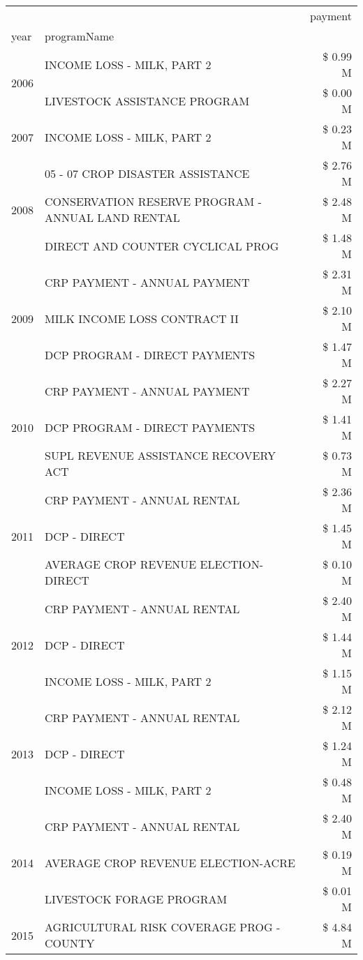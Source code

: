 \begin{tabular}{llr}
\toprule
 &  & payment \\
year & programName &  \\
\midrule
\multirow[t]{2}{*}{2006} & INCOME LOSS - MILK, PART 2 & \$ 0.99 M \\
 & LIVESTOCK ASSISTANCE PROGRAM & \$ 0.00 M \\
\cline{1-3}
2007 & INCOME LOSS - MILK, PART 2 & \$ 0.23 M \\
\cline{1-3}
\multirow[t]{3}{*}{2008} & 05 - 07 CROP DISASTER ASSISTANCE & \$ 2.76 M \\
 & CONSERVATION RESERVE PROGRAM - ANNUAL LAND RENTAL & \$ 2.48 M \\
 & DIRECT AND COUNTER CYCLICAL PROG & \$ 1.48 M \\
\cline{1-3}
\multirow[t]{3}{*}{2009} & CRP PAYMENT - ANNUAL PAYMENT & \$ 2.31 M \\
 & MILK INCOME LOSS CONTRACT II & \$ 2.10 M \\
 & DCP PROGRAM - DIRECT PAYMENTS & \$ 1.47 M \\
\cline{1-3}
\multirow[t]{3}{*}{2010} & CRP PAYMENT - ANNUAL PAYMENT & \$ 2.27 M \\
 & DCP PROGRAM - DIRECT PAYMENTS & \$ 1.41 M \\
 & SUPL REVENUE ASSISTANCE RECOVERY ACT & \$ 0.73 M \\
\cline{1-3}
\multirow[t]{3}{*}{2011} & CRP PAYMENT - ANNUAL RENTAL & \$ 2.36 M \\
 & DCP - DIRECT & \$ 1.45 M \\
 & AVERAGE CROP REVENUE ELECTION-DIRECT & \$ 0.10 M \\
\cline{1-3}
\multirow[t]{3}{*}{2012} & CRP PAYMENT - ANNUAL RENTAL & \$ 2.40 M \\
 & DCP - DIRECT & \$ 1.44 M \\
 & INCOME LOSS - MILK, PART 2 & \$ 1.15 M \\
\cline{1-3}
\multirow[t]{3}{*}{2013} & CRP PAYMENT - ANNUAL RENTAL & \$ 2.12 M \\
 & DCP - DIRECT & \$ 1.24 M \\
 & INCOME LOSS - MILK, PART 2 & \$ 0.48 M \\
\cline{1-3}
\multirow[t]{3}{*}{2014} & CRP PAYMENT - ANNUAL RENTAL & \$ 2.40 M \\
 & AVERAGE CROP REVENUE ELECTION-ACRE & \$ 0.19 M \\
 & LIVESTOCK FORAGE PROGRAM & \$ 0.01 M \\
\cline{1-3}
\multirow[t]{3}{*}{2015} & AGRICULTURAL RISK COVERAGE PROG - COUNTY & \$ 4.84 M \\

\end{tabular}
